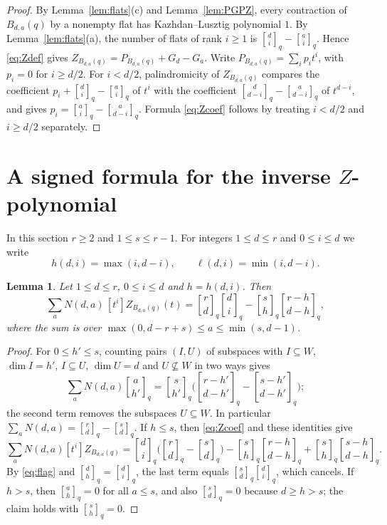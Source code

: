 \documentclass{amsart}
\newtheorem{lemma}[theorem]{Lemma}
\theoremstyle{remark}
\numberwithin{equation}{section}
\newcommand{\qbinom}[3]{\genfrac{[}{]}{0pt}{}{#1}{#2}_{#3}}
\begin{document}
\begin{proof}
By Lemma~\ref{lem:flats}(c) and Lemma~\ref{lem:PGPZ}, every contraction of $B_{d,a}(q)$ by a nonempty flat has Kazhdan--Lusztig polynomial $1$. By Lemma~\ref{lem:flats}(a), the number of flats of rank $i\ge1$ is $\qbinom{d}{i}{q}-\qbinom{a}{i}{q}$. Hence \eqref{eq:Zdef} gives $Z_{B_{d,a}(q)}=P_{B_{d,a}(q)}+G_d-G_a$. Write $P_{B_{d,a}(q)}=\sum_i p_it^i$, with $p_i=0$ for $i\ge d/2$. For $i<d/2$, palindromicity of $Z_{B_{d,a}(q)}$ compares the coefficient $p_i+\qbinom{d}{i}{q}-\qbinom{a}{i}{q}$ of $t^i$ with the coefficient $\qbinom{d}{d-i}{q}-\qbinom{a}{d-i}{q}$ of $t^{d-i}$, and gives $p_i=\qbinom{a}{i}{q}-\qbinom{a}{d-i}{q}$. Formula \eqref{eq:Zcoef} follows by treating $i<d/2$ and $i\ge d/2$ separately.
\end{proof}

\section{A signed formula for the inverse \texorpdfstring{$Z$}{Z}-polynomial}\label{sec:kernel}

In this section $r\ge2$ and $1\le s\le r-1$. For integers $1\le d\le r$ and $0\le i\le d$ we write
\[
  h(d,i)=\max(i,d-i),\qquad \ell(d,i)=\min(i,d-i).
\]

\begin{lemma}\label{lem:paircount}
Let $1\le d\le r$, $0\le i\le d$ and $h=h(d,i)$. Then
\[
  \sum_{a}N(d,a)\,[t^i]Z_{B_{d,a}(q)}(t)=\qbinom{r}{d}{q}\qbinom{d}{i}{q}-\qbinom{s}{h}{q}\qbinom{r-h}{d-h}{q},
\]
where the sum is over $\max(0,d-r+s)\le a\le\min(s,d-1)$.
\end{lemma}

\begin{proof}
For $0\le h'\le s$, counting pairs $(I,U)$ of subspaces with $I\subseteq W$, $\dim I=h'$, $I\subseteq U$, $\dim U=d$ and $U\not\subseteq W$ in two ways gives
\[
  \sum_aN(d,a)\qbinom{a}{h'}{q}=\qbinom{s}{h'}{q}\biggl(\qbinom{r-h'}{d-h'}{q}-\qbinom{s-h'}{d-h'}{q}\biggr);
\]
the second term removes the subspaces $U\subseteq W$. In particular $\sum_aN(d,a)=\qbinom{r}{d}{q}-\qbinom{s}{d}{q}$. If $h\le s$, then \eqref{eq:Zcoef} and these identities give
\[
  \sum_aN(d,a)[t^i]Z_{B_{d,a}(q)}
  =\qbinom{d}{i}{q}\biggl(\qbinom{r}{d}{q}-\qbinom{s}{d}{q}\biggr)
  -\qbinom{s}{h}{q}\qbinom{r-h}{d-h}{q}+\qbinom{s}{h}{q}\qbinom{s-h}{d-h}{q}.
\]
By \eqref{eq:flag} and $\qbinom{d}{h}{q}=\qbinom{d}{i}{q}$, the last term equals $\qbinom{s}{d}{q}\qbinom{d}{i}{q}$, which cancels. If $h>s$, then $\qbinom{a}{h}{q}=0$ for all $a\le s$, and also $\qbinom{s}{d}{q}=0$ because $d\ge h>s$; the claim holds with $\qbinom{s}{h}{q}=0$.
\end{proof}
\end{document}
